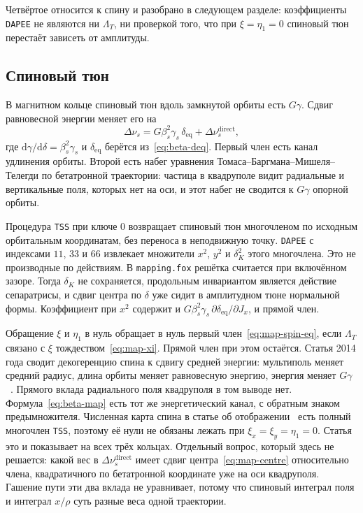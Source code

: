\documentclass[aps,pra,preprint,a4paper,amsmath,amssymb,longbibliography]{revtex4-2}
\begin{document}
Четвёртое относится к спину и разобрано в следующем разделе: коэффициенты \texttt{DAPEE} не являются ни $\Lambda_T$, ни проверкой того, что при $\xi=\eta_1=0$ спиновый тюн перестаёт зависеть от амплитуды.

\subsection{Спиновый тюн}
\label{sec:map-spin}

В магнитном кольце спиновый тюн вдоль замкнутой орбиты есть $G\gamma$. Сдвиг равновесной энергии меняет его на
\begin{equation}
\label{eq:map-spin-eq}
\Delta\nu_s
=
G\beta_s^2\gamma_s\,\delta_{\mathrm{eq}}
+\Delta\nu_s^{\mathrm{direct}},
\end{equation}
где $\mathrm{d}\gamma/\mathrm{d}\delta=\beta_s^2\gamma_s$ и $\delta_{\mathrm{eq}}$ берётся из~\eqref{eq:beta-deq}. Первый член есть канал удлинения орбиты. Второй есть набег уравнения Томаса--Баргмана--Мишеля--Телегди по бетатронной траектории: частица в квадруполе видит радиальные и вертикальные поля, которых нет на оси, и этот набег не сводится к $G\gamma$ опорной орбиты.

Процедура \texttt{TSS} при ключе $0$ возвращает спиновый тюн многочленом по исходным орбитальным координатам, без переноса в неподвижную точку. \texttt{DAPEE} с индексами $11$, $33$ и $66$ извлекает множители $x^2$, $y^2$ и $\delta_K^2$ этого многочлена. Это не производные по действиям. В \texttt{mapping.fox} решётка считается при включённом зазоре. Тогда $\delta_K$ не сохраняется, продольным инвариантом является действие сепаратрисы, и сдвиг центра по $\delta$ уже сидит в амплитудном тюне нормальной формы. Коэффициент при $x^2$ содержит и $G\beta_s^2\gamma_s\,\partial\delta_{\mathrm{eq}}/\partial J_x$, и прямой член.

Обращение $\xi$ и $\eta_1$ в нуль обращает в нуль первый член~\eqref{eq:map-spin-eq}, если $\Lambda_T$ связано с $\xi$ тождеством~\eqref{eq:map-xi}. Прямой член при этом остаётся. Статья 2014 года сводит декогеренцию спина к сдвигу средней энергии: мультиполь меняет средний радиус, длина орбиты меняет равновесную энергию, энергия меняет $G\gamma$~\cite{Senichev2014}. Прямого вклада радиального поля квадруполя в том выводе нет. Формула~\eqref{eq:beta-map} есть тот же энергетический канал, с обратным знаком предымножителя. Численная карта спина в статье об отображении~\cite{KolokolchikovMapping} есть полный многочлен \texttt{TSS}, поэтому её нули не обязаны лежать при $\xi_x=\xi_y=\eta_1=0$. Статья это и показывает на всех трёх кольцах. Отдельный вопрос, который здесь не решается: какой вес в $\Delta\nu_s^{\mathrm{direct}}$ имеет сдвиг центра~\eqref{eq:map-centre} относительно члена, квадратичного по бетатронной координате уже на оси квадруполя. Гашение пути эти два вклада не уравнивает, потому что спиновый интеграл поля и интеграл $x/\rho$ суть разные веса одной траектории.
\end{document}
